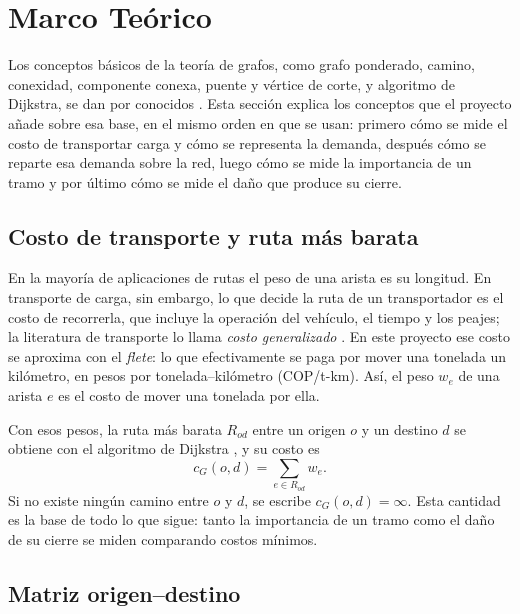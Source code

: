 \documentclass[conference]{IEEEtran}
\begin{document}
\section{Marco Teórico}
\label{sec:marco}

Los conceptos básicos de la teoría de grafos, como grafo ponderado, camino,
conexidad, componente conexa, puente y vértice de corte, y algoritmo de Dijkstra, se dan por conocidos
\cite{diestel2017}. Esta sección explica los conceptos que el proyecto añade
sobre esa base, en el mismo orden en que se usan: primero cómo se mide el costo
de transportar carga y cómo se representa la demanda, después cómo se reparte
esa demanda sobre la red, luego cómo se mide la importancia de un tramo y por
último cómo se mide el daño que produce su cierre.

\subsection{Costo de transporte y ruta más barata}
\label{sub:costo}

En la mayoría de aplicaciones de rutas el peso de una arista es su longitud. En
transporte de carga, sin embargo, lo que decide la ruta de un transportador es
el costo de recorrerla, que incluye la operación del vehículo, el tiempo y los
peajes; la literatura de transporte lo llama \emph{costo generalizado}
\cite{ortuzar2011}. En este proyecto ese costo se aproxima con el \emph{flete}:
lo que efectivamente se paga por mover una tonelada un kilómetro, en pesos por
tonelada--kilómetro (COP/t-km). Así, el peso $w_e$ de una arista $e$ es el
costo de mover una tonelada por ella.

Con esos pesos, la ruta más barata $R_{od}$ entre un origen $o$ y un destino
$d$ se obtiene con el algoritmo de Dijkstra \cite{dijkstra1959}, y su costo es
\begin{equation}\label{eq:cmin}
c_G(o,d)=\sum_{e\in R_{od}} w_e .
\end{equation}
Si no existe ningún camino entre $o$ y $d$, se escribe $c_G(o,d)=\infty$. Esta
cantidad es la base de todo lo que sigue: tanto la importancia de un tramo como
el daño de su cierre se miden comparando costos mínimos.

\subsection{Matriz origen--destino}
\label{sub:od}
\end{document}
